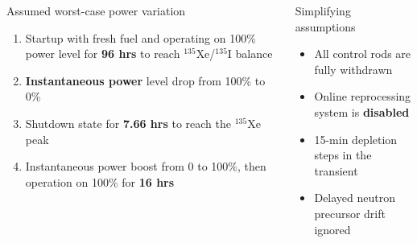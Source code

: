 \begin{frame}
\begin{columns}
	\column[t]{6cm}
	\begin{block}{Assumed worst-case power variation}
		\begin{enumerate}             
			\item Startup with fresh fuel and operating on 100\% power
			level for \textbf{96 hrs} to reach $^{135}$Xe/$^{135}$I balance
			\item \textbf{Instantaneous power} level drop from 100\% to 0\%
			\item Shutdown state for \textbf{7.66 hrs} to reach the 
			$^{135}$Xe peak
			\item Instantaneous power boost from 0 to 100\%, then operation 
			on 100\% for \textbf{16 hrs}
		\end{enumerate}
	\end{block}
	\begin{block}{Simplifying assumptions}
		\begin{itemize}
			\item All control rods are fully withdrawn
			\item Online reprocessing system is \textbf{disabled}
			\item 15-min depletion steps in the transient
			\item Delayed
neutron precursor drift ignored
		\end{itemize}

	\end{block}
\end{columns}
\end{frame}
